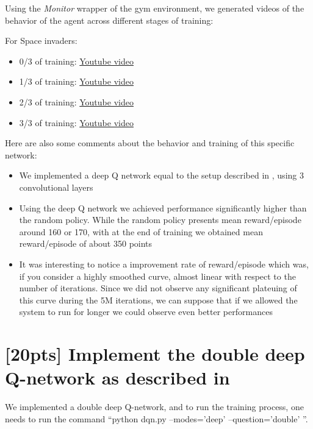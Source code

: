 \documentclass{article}
\begin{document}
Using the \textit{Monitor} wrapper of the gym environment, we generated videos of the behavior of the agent across different stages of training:

For Space invaders:
\begin{itemize}
  \item 0/3 of training: \href{https://youtu.be/vY9SEmtxhKk}{Youtube video}
  \item 1/3 of training: \href{https://youtu.be/UjY8P2kfdUI}{Youtube video}
  \item 2/3 of training: \href{https://youtu.be/mJXHLZ30AlY}{Youtube video}
  \item 3/3 of training: \href{https://youtu.be/ddNLULEoE5A}{Youtube video}
\end{itemize}

Here are also some comments about the behavior and training of this specific network:

\begin{itemize}
  \item We implemented a deep Q network equal to the setup described in \cite{mnih2015human}, using 3 convolutional layers
  \item Using the deep Q network we achieved performance significantly higher than the random policy. While the random policy presents mean reward/episode around 160 or 170, with at the end of training we obtained mean reward/episode of about 350 points
  \item It was interesting to notice a improvement rate of reward/episode which was, if you consider a highly smoothed curve, almost linear with respect to the number of iterations. Since we did not observe any significant plateuing of this curve during the 5M iterations, we can suppose that if we allowed the system to run for longer we could observe even better performances
\end{itemize}

\section{[20pts] Implement the double deep Q-network as described in \cite{van2016deep}}

We implemented a double deep Q-network, and to run the training process, one needs to run the command ``python dqn.py --modes='deep' --question='double' ''.
\end{document}
